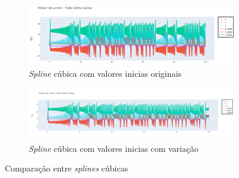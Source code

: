 \documentclass[12pt, a4paper]{article}
\begin{document}
    \begin{figure}[H]
        \centering
        \begin{subfigure}{1.0\textwidth}
            \centering
            \includegraphics[width=\textwidth]{img/spline.png}
            \caption{\textit{Spline} cúbica com valores inicias originais}
            \label{fig:spline-original}
        \end{subfigure}
        \vfill
        \begin{subfigure}{1.0\textwidth}
            \centering
            \includegraphics[width=\textwidth]{img/plotvarspline.png}
            \caption{\textit{Spline} cúbica com valores inicias com variação}
            \label{fig:spline-va}
        \end{subfigure}
        \caption{Comparação entre \textit{splines} cúbicas}
        \label{fig:comparacao-splines}
    \end{figure}
    
\end{document}
